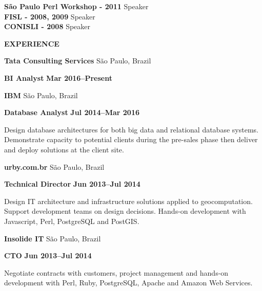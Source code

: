 \documentclass[a4paper,oneside]{memoir}
\begin{document}
\begin{multicols}{2}
\begin{flushright}
\normalsize

\textbf{São Paulo Perl Workshop - 2011}
\scriptsize
Speaker
\normalsize\\

\textbf{FISL - 2008, 2009}
\scriptsize
Speaker
\normalsize\\

\textbf{CONISLI - 2008}
\scriptsize
Speaker
\normalsize\\

\end{flushright}

\columnbreak

\begin{flushleft}

\Large\textbf{\color{RoyalBlue}\uppercase{Experience}}\normalsize

\textbf{\color{RoyalBlue}Tata Consulting Services} \footnotesize São Paulo, Brazil\normalsize

\textbf{BI Analyst}
\footnotesize\textbf{Mar 2016--Present}\normalsize

\textbf{\color{RoyalBlue}IBM} \footnotesize São Paulo, Brazil\normalsize

\textbf{Database Analyst}
\footnotesize\textbf{Jul 2014--Mar 2016}\normalsize

\scriptsize
Design database architectures for both big data and relational database systems.
Demonstrate capacity to potential clients during the pre-sales phase then
deliver and deploy solutions at the client site.

\normalsize

\textbf{\color{RoyalBlue}urby.com.br} \footnotesize São Paulo, Brazil\normalsize

\textbf{Technical Director}
\footnotesize\textbf{Jun 2013--Jul 2014}\normalsize

\scriptsize

Design IT architecture and infrastructure solutions applied to geocomputation.
Support development teams on design decisions. Hands-on development with
Javascript, Perl, PostgreSQL and PostGIS.

\normalsize

\textbf{\color{RoyalBlue}Insolide IT} \footnotesize São Paulo, Brazil\normalsize

\textbf{CTO}
\footnotesize\textbf{Jun 2013--Jul 2014}\normalsize

\scriptsize
Negotiate contracts with customers, project management and hands-on development
with Perl, Ruby, PostgreSQL, Apache and Amazon Web Services.


\end{flushleft}
\end{multicols}
\end{document}

